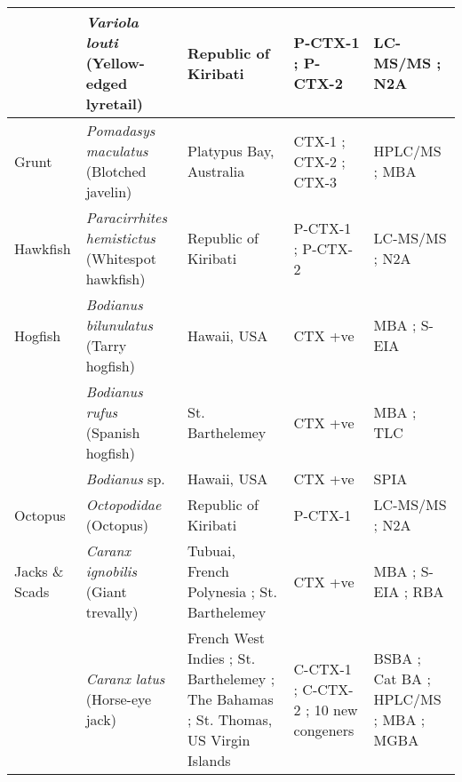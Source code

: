\documentclass[12pt]{article}
\begin{document}
\begin{longtable}{ | p{2cm} | p{3cm} | p{4.5cm} | p{2cm} | p{3cm} | }
	& \emph{Variola louti} (Yellow-edged lyretail) & Republic of Kiribati \cite{mak2013pacific} & P-CTX-1 \cite{mak2013pacific}; P-CTX-2 \cite{mak2013pacific} & LC-MS/MS \cite{mak2013pacific}; N2A \cite{mak2013pacific} \\
	\hline
	Grunt & \emph{Pomadasys maculatus} (Blotched javelin) & Platypus Bay, Australia \cite{lewis1992multiple} & CTX-1 \cite{lewis1992multiple}; CTX-2 \cite{lewis1992multiple}; CTX-3 \cite{lewis1992multiple} & HPLC/MS \cite{lewis1992multiple}; MBA \cite{lewis1992multiple} \\
	\hline
	Hawkfish & \emph{Paracirrhites hemistictus} (Whitespot hawkfish) & Republic of Kiribati \cite{mak2013pacific} & P-CTX-1 \cite{mak2013pacific}; P-CTX-2 \cite{mak2013pacific} & LC-MS/MS \cite{mak2013pacific}; N2A \cite{mak2013pacific} \\
	\hline
	Hogfish & \emph{Bodianus bilunulatus} (Tarry hogfish) & Hawaii, USA \cite{hokama1993evaluation} & CTX +ve \cite{hokama1993evaluation} & MBA \cite{hokama1993evaluation}; S-EIA \cite{hokama1993evaluation} \\
	& \emph{Bodianus rufus} (Spanish hogfish) & St. Barthelemey \cite{vernoux1986heterogeneity} & CTX +ve \cite{vernoux1986heterogeneity} & MBA \cite{vernoux1986heterogeneity}; TLC \cite{vernoux1986heterogeneity} \\
	& \emph{Bodianus} sp. & Hawaii, USA \cite{hokama1990simplified} & CTX +ve \cite{hokama1990simplified} & SPIA \cite{hokama1990simplified}\\
	\hline
Octopus & \emph{Octopodidae} (Octopus) & Republic of Kiribati \cite{mak2013pacific} & P-CTX-1 \cite{mak2013pacific} & LC-MS/MS \cite{mak2013pacific}; N2A \cite{mak2013pacific} \\
\hline
	Jacks \& Scads & \emph{Caranx ignobilis} (Giant trevally) & Tubuai, French Polynesia \cite{darius2007ciguatera}; St. Barthelemey \cite{vernoux1986heterogeneity} & CTX +ve \cite{hokama1993evaluation,darius2007ciguatera} & MBA \cite{hokama1993evaluation}; S-EIA \cite{hokama1993evaluation}; RBA \cite{darius2007ciguatera} \\
	& \emph{Caranx latus} (Horse-eye jack) & French West Indies \cite{pottier2002characterisation}; St. Barthelemey \cite{vernoux1997isolation,lewis1998structure}; The Bahamas \cite{larson1967ciguatera}; St. Thomas, US Virgin Islands \cite{granade1976ciguatera} & C-CTX-1 \cite{pottier2002characterisation,vernoux1997isolation,lewis1998structure}; C-CTX-2 \cite{vernoux1997isolation,pottier2002characterisation,lewis1998structure}; 10 new congeners \cite{pottier2002characterisation} & BSBA \cite{granade1976ciguatera}; Cat BA \cite{larson1967ciguatera}; HPLC/MS \cite{pottier2002characterisation,vernoux1997isolation,lewis1998structure}; MBA \cite{pottier2002characterisation,vernoux1997isolation} ; MGBA \cite{granade1976ciguatera}\\

\end{longtable}
\end{document}
